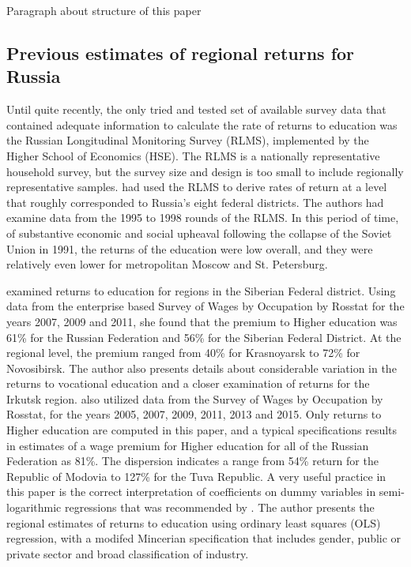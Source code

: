 \documentclass[alpha-refs]{wiley-article-03v}
\begin{document}
Paragraph about structure of this paper \lipsum[1]

\subsection{Previous estimates of regional returns for Russia}

Until quite recently, the only tried and tested set of available survey data that contained adequate information to calculate the rate of returns to education was the Russian Longitudinal Monitoring Survey (RLMS), implemented by the Higher School of Economics (HSE). The RLMS is a nationally representative household survey, but the survey size and design is too small to include regionally representative samples. \cite{cheidvasser2007} had used the RLMS to derive rates of return at a level that roughly corresponded to Russia's eight federal districts. The authors had examine data from the 1995 to 1998 rounds of the RLMS. In this period of time, of substantive economic and social upheaval following the collapse of the Soviet Union in 1991, the returns of the education were low overall, and they were relatively even lower for metropolitan Moscow and St. Petersburg. 

\cite{baeva2013} examined returns to education for regions in the Siberian Federal district. Using data from the enterprise based Survey of Wages by Occupation by Rosstat for the years 2007, 2009 and 2011, she found that the premium to Higher education was 61\% for the Russian Federation and 56\% for the Siberian Federal District. At the regional level, the premium ranged from 40\% for Krasnoyarsk to 72\% for Novosibirsk. The author also presents details about considerable variation in the returns to vocational education and a closer examination of returns for the Irkutsk region. \cite{oshchepkov2018} also utilized data from the Survey of Wages by Occupation by Rosstat, for the years 2005, 2007, 2009, 2011, 2013 and 2015. Only returns to Higher education are computed in this paper, and a typical specifications results in estimates of a wage premium for Higher education for all of the Russian Federation as 81\%. The dispersion indicates a range from 54\% return for the Republic of Modovia to 127\% for the Tuva Republic. A very useful practice in this paper is the correct interpretation of coefficients on dummy variables in semi-logarithmic regressions that was recommended by \cite{halvorsen1980}. The author presents the regional estimates of returns to education using ordinary least squares (OLS) regression, with a modifed Mincerian specification that includes gender, public or private sector and broad classification of industry. 
\end{document}

